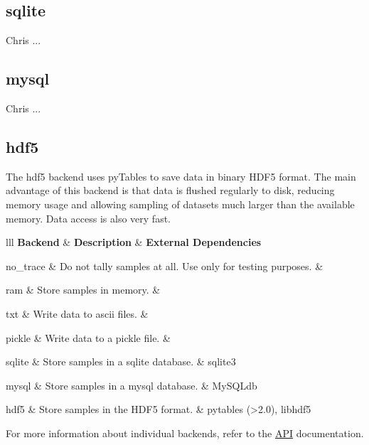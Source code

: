 \subsection*{sqlite}
\label{sqlite}

Chris ...



\hypertarget{mysql}{}
\subsection*{mysql}
\label{mysql}

Chris ...



\hypertarget{hdf5}{}
\subsection*{hdf5}
\label{hdf5}

The hdf5 backend uses pyTables to save data in binary HDF5 format. The main advantage of this backend is that data is flushed regularly to disk, reducing memory usage and allowing sampling of datasets much larger than the available memory. Data access is also very fast.

\leavevmode
\begin{table}[c]{lll}
\hline
\textbf{
Backend
} & \textbf{
Description
} & \textbf{
External Dependencies
} \\
\hline
\endhead

no{\_}trace
 & 
Do not tally samples at all. Use only for testing purposes.
 &  \\
\hline

ram
 & 
Store samples in memory.
 &  \\
\hline

txt
 & 
Write data to ascii files.
 &  \\
\hline

pickle
 & 
Write data to a pickle file.
 &  \\
\hline

sqlite
 & 
Store samples in a sqlite database.
 & 
sqlite3
 \\
\hline

mysql
 & 
Store samples in a mysql database.
 & 
MySQLdb
 \\
\hline

hdf5
 & 
Store samples in the HDF5 format.
 & 
pytables ({\textgreater}2.0), libhdf5
 \\
\hline
\end{table}

For more information about individual backends, refer to the \href{docs/API.pdf}{API} documentation.

\